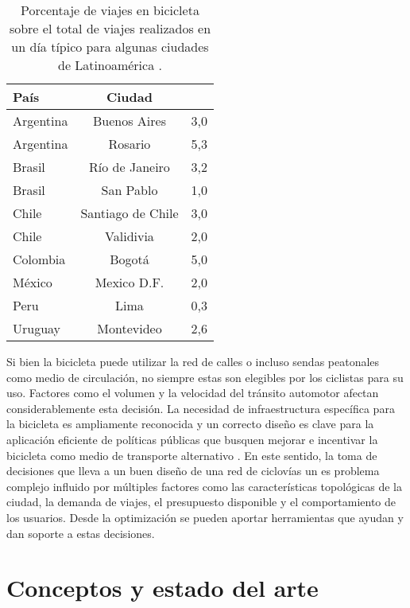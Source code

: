   \begin{table}[h!]
    \centering
      \begin{tabular}{lcS}
      \toprule
      País & Ciudad &  \\
      \midrule
        Argentina & Buenos Aires & 3,0 \\
        Argentina & Rosario & 5,3 \\
        Brasil & Río de Janeiro & 3,2 \\
        Brasil & San Pablo & 1,0 \\
        Chile & Santiago de Chile & 3,0 \\
        Chile & Validivia & 2,0 \\
        Colombia & Bogotá & 5,0 \\
        México & Mexico D.F. & 2,0 \\
        Peru & Lima & 0,3 \\
        Uruguay & Montevideo & 2,6 \\
      \bottomrule
    \end{tabular}
      \caption{Porcentaje de viajes en bicicleta sobre el total de viajes realizados en un día típico para algunas ciudades de Latinoamérica \textcite{Idb2020}.}
      \label{table:bicycleusagelatinamerica}
  \end{table}

  Si bien la bicicleta puede utilizar la red de calles o incluso sendas peatonales como medio de circulación, no siempre estas son elegibles por los ciclistas para su uso. Factores como el volumen y la velocidad del tránsito automotor afectan considerablemente esta decisión. La necesidad de infraestructura específica para la bicicleta es ampliamente reconocida y un correcto diseño es clave para la aplicación eficiente de políticas públicas que busquen mejorar e incentivar la bicicleta como medio de transporte alternativo \parencite{Hunt2007}. En este sentido, la toma de decisiones que lleva a un buen diseño de una red de ciclovías un es problema complejo influido por múltiples factores como las características topológicas de la ciudad, la demanda de viajes, el presupuesto disponible y el comportamiento de los usuarios. Desde la optimización se pueden aportar herramientas que ayudan y dan soporte a estas decisiones.

  \section{Conceptos y estado del arte}

